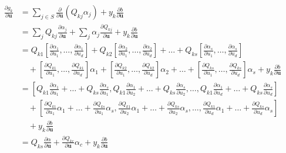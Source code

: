 \documentclass[letterpaper,12pt,oneside]{book}
\begin{document}
{{{{\begin{align*}
\frac{\partial g_k}{\partial \mathbf{u}} &= \sum_{j \in S} \frac{\partial} {\partial \mathbf{u}} (Q_{kj} \alpha_j )  + y_k \frac{\partial b}{\partial \mathbf{u}} \\          
&= \sum_j Q_{kj} \frac{\partial \alpha_j} {\partial \mathbf{u}}  + \sum_j   \alpha_j  \frac{\partial Q_{kj}} {\partial \mathbf{u}}   + y_k \frac{\partial b}{\partial \mathbf{u}} \\[2mm]
&= Q_{k1}\left[ \frac{\partial \alpha_1}{\partial u_1},  \dots, \frac{\partial \alpha_1}{\partial u_d} \right] + 
  Q_{k2}\left[ \frac{\partial \alpha_2}{\partial u_1},  \dots, \frac{\partial \alpha_2}{\partial u_d} \right] + \dots + 
  Q_{ks}\left[ \frac{\partial \alpha_s}{\partial u_1},  \dots, \frac{\partial \alpha_s}{\partial u_d} \right] \\ 
&\quad + \left[ \frac{\partial Q_{k1}}{\partial u_1},  \dots, \frac{\partial Q_{k1}}{\partial u_d} \right] \alpha_1  +  
  \left[ \frac{\partial Q_{k2}}{\partial u_1},  \dots, \frac{\partial Q_{k2}}{\partial u_d} \right]\alpha_2 + \dots + 
  \left[ \frac{\partial Q_{ks}}{\partial u_1},  \dots, \frac{\partial Q_{ks}}{\partial u_d} \right]\alpha_s + y_k \frac{\partial b}{\partial \mathbf{u}} \\[1mm]
&= \left[ Q_{k1} \frac{\partial \alpha_1}{\partial u_1}+ \dots + Q_{ks} \frac{\partial \alpha_s}{\partial u_1}, 
        Q_{k1} \frac{\partial \alpha_1}{\partial u_2}+ \dots + Q_{ks} \frac{\partial \alpha_s}{\partial u_2}, 
        \dots,  
        Q_{k1} \frac{\partial \alpha_1}{\partial u_d}+ \dots + Q_{ks} \frac{\partial \alpha_s}{\partial u_d} \right] \\ 
&\quad + \left[  \frac{\partial Q_{k1}}{\partial u_1}\alpha_1 + \dots +  \frac{\partial Q_{ks} }{\partial u_1} \alpha_s, 
               \frac{\partial Q_{k1}}{\partial u_2}\alpha_1 + \dots +  \frac{\partial Q_{ks} }{\partial u_2} \alpha_s, 
               \dots,  
               \frac{\partial Q_{k1}}{\partial u_d}\alpha_1 + \dots +  \frac{\partial Q_{ks} }{\partial u_d} \alpha_s \right] \\
&\quad + y_k \frac{\partial b}{\partial \mathbf{u}} \\[1mm]
&= Q_{ks} \frac{\partial \alpha}{\partial \mathbf{u}} + \frac{\partial Q_{kc}}{\partial \mathbf{u}} \alpha_c + y_k \frac{\partial b}{\partial \mathbf{u}}
\end{align*}

    
    
    
    
}}}}
\end{document}
